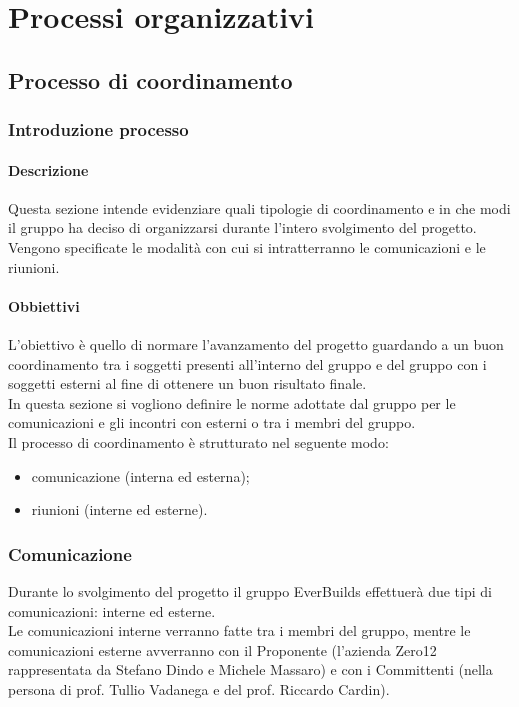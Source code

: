 \section{Processi organizzativi}
	\subsection{Processo di coordinamento}
		\subsubsection{Introduzione processo}
			\paragraph{Descrizione}
				Questa sezione intende evidenziare quali tipologie di coordinamento e in che modi il gruppo ha deciso di organizzarsi durante l’intero svolgimento del progetto.\\ 
				Vengono specificate le modalità con cui si intratterranno le comunicazioni e le riunioni.\\
			\paragraph{Obbiettivi}
				L’obiettivo è quello di normare l’avanzamento del progetto guardando a un buon coordinamento tra i soggetti presenti all’interno del gruppo e del gruppo con i soggetti esterni al fine di ottenere un buon risultato finale.\\ 
				In questa sezione si vogliono definire le norme adottate dal gruppo per le comunicazioni e gli incontri con esterni o tra i membri del gruppo.\\
				Il processo di coordinamento è strutturato nel seguente modo:\\
				\begin{itemize}
					\item comunicazione (interna ed esterna);
					\item riunioni (interne ed esterne).
				\end{itemize}
		\subsubsection{Comunicazione}
			Durante lo svolgimento del progetto il gruppo EverBuilds effettuerà due tipi di comunicazioni: interne ed esterne. \\
			Le comunicazioni interne verranno fatte tra i membri del gruppo, mentre le comunicazioni esterne avverranno con il Proponente (l’azienda Zero12 rappresentata da Stefano Dindo e Michele Massaro) e con i Committenti (nella persona di prof. Tullio Vadanega e del prof. Riccardo Cardin).\\

